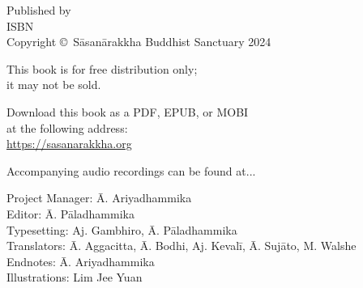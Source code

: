 
\cleartoverso
\thispagestyle{empty}

\vspace*{-\baselineskip}

{%

  \ifafiveversion \fontsize{10}{16}\selectfont \fi
  \ifasixversion \fontsize{7.5}{11}\selectfont \fi
  \ifbsixversion \fontsize{7.5}{11}\selectfont \fi
  \centering
  \setlength{\parindent}{0pt}%

  \ifafiveversion \vspace{0.5cm} \fi

  Published by \publisher\\
  ISBN \theISBN\\
  Copyright \copyright\ Sāsanārakkha Buddhist Sanctuary 2024

  \ifafiveversion \vspace{0.5cm} \fi
  \ifasixversion \vspace{0.4cm} \fi
  \ifbsixversion \vspace{0.4cm} \fi

  This book is for free distribution only;\\
  it may not be sold.

  \ifafiveversion \vspace{0.5cm} \fi
  \ifasixversion \vspace{0.4cm} \fi
  \ifbsixversion \vspace{0.4cm} \fi

  Download this book as a PDF, EPUB, or MOBI\\
  at the following address:\\
  \href{https://sasanarakkha.org/}{https://sasanarakkha.org}

  Accompanying audio recordings can be found at...

  \ifafiveversion \vspace{0.5cm} \fi
  \ifasixversion \vspace{0.4cm} \fi
  \ifbsixversion \vspace{0.4cm} \fi

  Project Manager: Ā. Ariyadhammika\\
  Editor: Ā. Pāladhammika\\
  Typesetting: Aj. Gambhiro, Ā. Pāladhammika\\
  Translators: Ā. Aggacitta, Ā. Bodhi, Aj. Kevalī, Ā. Sujāto, M. Walshe\\
  Endnotes: Ā. Ariyadhammika\\
  Illustrations: Lim Jee Yuan


}
